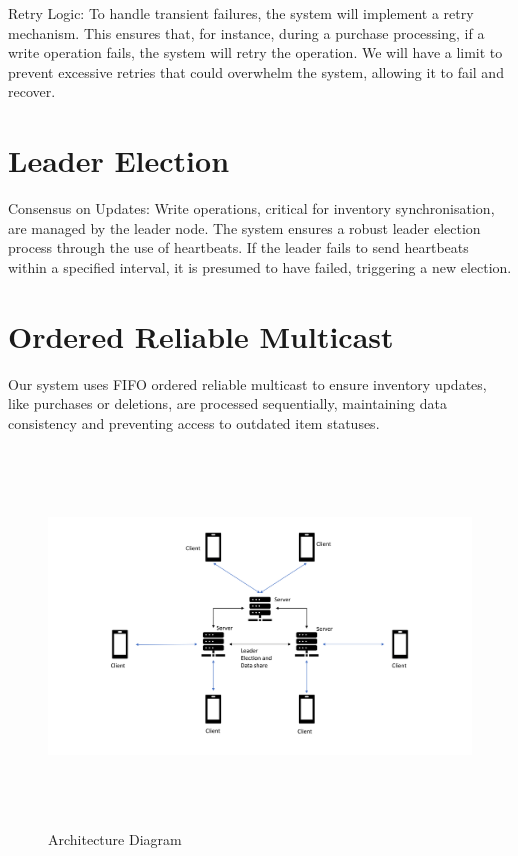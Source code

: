 Retry Logic: To handle transient failures, the system will implement a retry mechanism. This ensures that, for instance, during a purchase processing, if a write operation fails, the system will retry the operation. We will have a limit to  prevent excessive retries that could overwhelm the system, allowing it to fail and recover.

\section{Leader Election} \label{sec:Election}
Consensus on Updates: Write operations, critical for inventory synchronisation, are managed by the leader node. The system ensures a robust leader election process through the use of heartbeats. If the leader fails to send heartbeats within a specified interval, it is presumed to have failed, triggering a new election.

\section{Ordered Reliable Multicast} \label{sec:OrderedReliableMulticast}
Our system uses FIFO ordered reliable multicast to ensure inventory updates, like purchases or deletions, are processed sequentially, maintaining data consistency and preventing access to outdated item statuses.

\begin{figure}[h!]
        \includegraphics[height=10cm, width=18cm]{images/Architecture.png}
        \caption{Architecture Diagram}
        \label{fig:architecture}
\end{figure}
